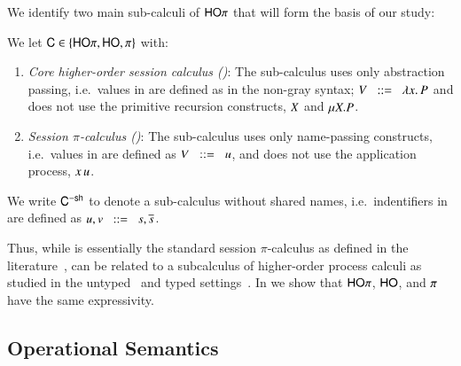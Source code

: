 We identify two main sub-calculi of $\mathsf{HO}\pi$
that will form the basis of our study:
%
\begin{definition}\rm
	We let $\mathsf{C} \in \{\mathsf{HO}\pi, \mathsf{HO}, \pi\}$ with:
%
	\begin{enumerate}[-]
		\item	{\em Core higher-order session calculus (\HO)}:
			The sub-calculus \HO uses only abstraction passing, i.e.~values
			in 
			are defined as in the non-gray syntax;
			$V \;\;::=\;\; \lambda x.\,P$ and does not use the primitive
			recursion constructs, $X$ and $\mu X. P$.

		\item	{\em Session $\pi$-calculus (\sessp)}:
			The sub-calculus \sessp uses only name-passing constructs, i.e.~values
			in 
			are defined as $V \;\;::=\;\; u$, and does not use the application process,
			$x\,u$.
	\end{enumerate}
%
	We write $\mathsf{C}^\mathsf{-sh}$ to denote a sub-calculus without shared names,
	i.e.~indentifiers in  are defined as $u,v \;\;::=\;\; s, \overline{s}$.
\end{definition}
%
Thus, while \sessp is essentially the standard session $\pi$-calculus
as defined in the literature~\cite{honda.vasconcelos.kubo:language-primitives,GH05},
\HO can be related to a subcalculus of higher-order process calculi as studied
in the untyped~\cite{San923,SangiorgiD:picatomp,DBLP:journals/lmcs/JeffreyR05}
and typed settings~\cite{tlca07,mostrous09sessionbased}.
In  we show that 
$\mathsf{HO}\pi$, $\mathsf{HO}$, and $\pi$ have the same expressivity.

\subsection{Operational Semantics}

\label{subsec:reduction_semantics}


